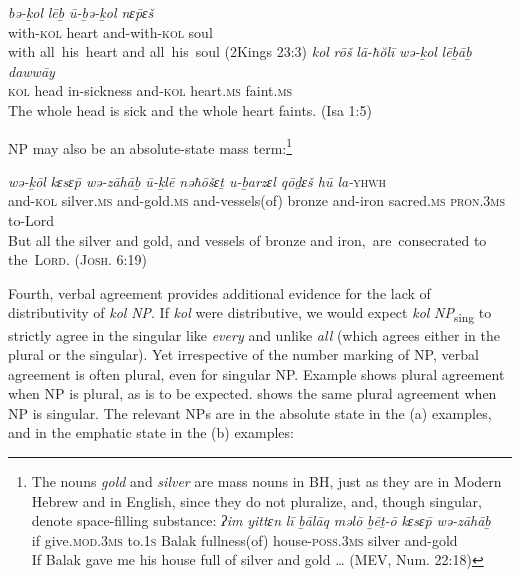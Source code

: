 \documentclass[output=paper]{langsci/langscibook}
\begin{document}
\ea%
    \label{ex:doron:17}
    \ea
    \gll \textit{bə-ḵol}       \textit{lēḇ}      \textit{ū-ḇə{}-ḵol           nɛ\={p}ɛš} \\
         with-\textsc{kol} heart  and-with-\textsc{kol}  soul        \\
    \glt with all~his~heart and all~his~soul (2Kings 23:3) 
    \ex  
    \gll \textit{kol}    \textit{rōš}     \textit{lā-ħŏlī}        \textit{wə-ḵol}     \textit{lēḇāḇ}        \textit{dawwāy}\\
         \textsc{kol} head  in-sickness  and-\textsc{kol} heart.\textsc{ms}  faint.\textsc{ms}\\
    \glt The whole head is sick and the whole heart faints. (Isa 1:5)
    \z
\z

NP may also be an absolute-state mass term:\footnote{The nouns \textit{gold} and \textit{silver} are mass nouns in BH, just as they are in Modern Hebrew and in English, since they do not pluralize, and, though singular, denote space-filling substance:
\ea 
    \gll \textit{ʔim} \textit{yittɛn}                \textit{lī}      \textit{ḇālāq} \textit{məlō}             \textit{ḇēṯ-ō}                    \textit{kɛsɛ}\textrm{\textit{\={p}}} \textit{wə-zāhāḇ}\\
            if    give.\textsc{mod.3ms} to.\textsc{1s} Balak fullness(of)  house-\textrm{\textsc{poss.3ms}}  silver and-gold \\
    \glt If Balak gave me his house full of silver and gold … (MEV, Num. 22:18)
\z}

\ea%
    \label{ex:doron:18}
    \gll \textit{wə-ḵōl}     \textit{kɛsɛ\={p}        wə-zāhāḇ       ū{}-ḵlē                 nəħōšɛṯ  u-ḇarzɛl   qōḏɛš        hū            la-}\textsc{yhwh}\\
         and-\textsc{kol} silver.\textsc{ms} and-gold.\textsc{ms}  and-vessels(of)  bronze   and-iron  sacred.\textsc{ms}  \textsc{pron.3ms}  to-Lord\\
    \glt But all the silver and gold, and vessels of bronze and iron,{~}are{~}consecrated to the{~}\textsc{\textsc{L}ord. (Josh. 6:19)} 
    \z

Fourth, verbal agreement provides additional evidence for the lack of distributivity of \textit{kol} \textit{NP}. If \textit{kol} were distributive, we would expect \textit{kol} \textit{NP}\textsubscript{sing} to strictly agree in the singular like \textit{every} and unlike \textit{all} (which agrees either in the plural or the singular). Yet irrespective of the number marking of NP, verbal agreement is often plural, even for singular NP. Example  shows plural agreement when NP is plural, as is to be expected.  shows the same plural agreement when NP is singular. The relevant NPs are in the absolute state in the (a) examples, and in the emphatic state in the (b) examples: 
\end{document}
